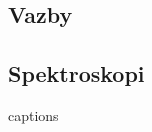 \documentclass[
  digital, %
  table,   %
  lof,     %
  lot,     %
]{fithesis3}
\begin{document}
\subsection{Vazby}

\subsection{Spektroskopi}














{\csname captions\languagename\endcsname %
\makeatletter %
  \thesis@selectLocale{\thesis@locale}\makeatother
\printbibliography[heading=bibintoc]} %
\appendix %
\end{document}
